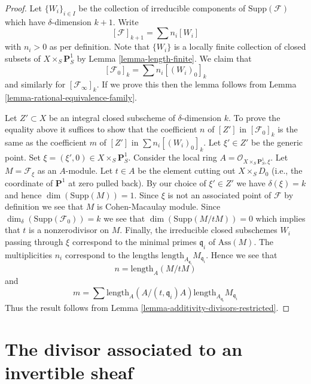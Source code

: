 \begin{proof}
Let $\{W_i\}_{i \in I}$ be the collection of irreducible
components of $\text{Supp}(\mathcal{F})$
which have $\delta$-dimension $k + 1$.
Write
$$
[\mathcal{F}]_{k + 1} = \sum n_i[W_i]
$$
with $n_i > 0$ as per definition. Note that $\{W_i\}$
is a locally finite collection of closed subsets of
$X \times_S \mathbf{P}^1_S$ by Lemma \ref{lemma-length-finite}.
We claim that
$$
[\mathcal{F}_0]_k = \sum n_i[(W_i)_0]_k
$$
and similarly for $[\mathcal{F}_\infty]_k$. If we prove this then the lemma
follows from Lemma \ref{lemma-rational-equivalence-family}.

\medskip\noindent
Let $Z' \subset X$ be an integral closed subscheme of $\delta$-dimension $k$.
To prove the equality above it suffices to show that the coefficient $n$
of $[Z']$ in $[\mathcal{F}_0]_k$ is the same as the coefficient $m$ of
$[Z']$ in $\sum n_i[(W_i)_0]_k$. Let $\xi' \in Z'$ be the generic point.
Set $\xi = (\xi', 0) \in  X \times_S \mathbf{P}^1_S$.
Consider the local ring $A = \mathcal{O}_{X \times_S \mathbf{P}^1_S, \xi}$.
Let $M = \mathcal{F}_\xi$ as an $A$-module.
Let $t \in A$ be the element cutting out $X \times_S D_0$
(i.e., the coordinate of $\mathbf{P}^1$ at zero pulled back).
By our choice of $\xi' \in Z'$ we have $\delta(\xi) = k$
and hence $\dim(\text{Supp}(M)) = 1$. Since $\xi$ is not an associated point
of $\mathcal{F}$ by definition we see that $M$ is Cohen-Macaulay module.
Since $\dim_\delta(\text{Supp}(\mathcal{F}_0)) = k$
we see that $\dim(\text{Supp}(M/tM)) = 0$ which implies that $t$
is a nonzerodivisor on $M$. Finally, the irreducible closed subschemes
$W_i$ passing through $\xi$ correspond to the minimal primes
$\mathfrak q_i$ of $\text{Ass}(M)$. The multiplicities $n_i$ correspond
to the lengths $\text{length}_{A_{\mathfrak q_i}}M_{\mathfrak q_i}$.
Hence we see that
$$
n = \text{length}_A(M/tM)
$$
and
$$
m = \sum
\text{length}_A(A/(t, \mathfrak q_i)A)
\text{length}_{A_{\mathfrak q_i}}M_{\mathfrak q_i}
$$
Thus the result follows from
Lemma \ref{lemma-additivity-divisors-restricted}.
\end{proof}
















\section{The divisor associated to an invertible sheaf}
\label{section-divisor-invertible-sheaf}

